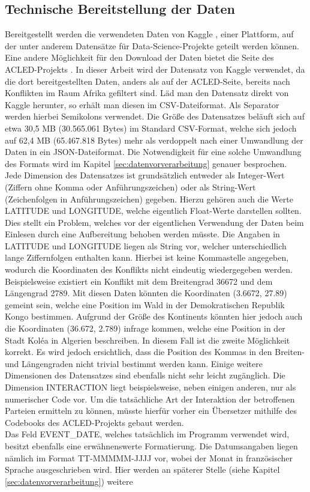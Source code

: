 \documentclass[usegeometry=true]{scrartcl}
\begin{document}
\subsection{Technische Bereitstellung der Daten}

Bereitgestellt werden die verwendeten Daten von Kaggle \cite{kaggle}, einer Plattform, auf der unter anderem Datensätze für Data-Science-Projekte geteilt werden können. Eine andere Möglichkeit für den Download der Daten bietet die Seite des ACLED-Projekts \cite{acled}. In dieser Arbeit wird der Datensatz von Kaggle verwendet, da die dort bereitgestellten Daten, anders als auf der ACLED-Seite, bereits nach Konflikten im Raum Afrika gefiltert sind. Läd man den Datensatz direkt von Kaggle herunter, so erhält man diesen im CSV-Dateiformat. Als Separator werden hierbei Semikolons verwendet. Die Größe des Datensatzes beläuft sich auf etwa 30,5 MB (30.565.061 Bytes) im Standard CSV-Format, welche sich jedoch auf 62,4 MB (65.467.818 Bytes) mehr als verdoppelt nach einer Umwandlung der Daten in ein JSON-Dateiformat. Die Notwendigkeit für eine solche Umwandlung des Formats wird im Kapitel \ref{sec:datenvorverarbeitung} genauer besprochen.\\ Jede Dimension des Datensatzes ist grundsätzlich entweder als Integer-Wert (Ziffern ohne Komma oder Anführungszeichen) oder als String-Wert (Zeichenfolgen in Anführungszeichen) gegeben. Hierzu gehören auch die Werte LATITUDE und LONGITUDE, welche eigentlich Float-Werte darstellen sollten. Dies stellt ein Problem, welches vor der eigentlichen Verwendung der Daten beim Einlesen durch eine Aufbereitung behoben werden müsste. Die Angaben in LATITUDE und LONGITUDE liegen als String vor, welcher unterschiedlich lange Ziffernfolgen enthalten kann. Hierbei ist keine Kommastelle angegeben, wodurch die Koordinaten des Konflikts nicht eindeutig wiedergegeben werden. Beispielsweise existiert ein Konflikt mit dem Breitengrad 36672 und dem Längengrad 2789. Mit diesen Daten könnten die Koordinaten (3.6672, 27.89) gemeint sein, welche eine Position im Wald in der Demokratischen Republik Kongo bestimmen. Aufgrund der Größe des Kontinents könnten hier jedoch auch die Koordinaten (36.672, 2.789) infrage kommen, welche eine Position in der Stadt Koléa in Algerien beschreiben. In diesem Fall ist die zweite Möglichkeit korrekt. Es wird jedoch ersichtlich, dass die Position des Kommas in den Breiten- und Längengraden nicht trivial bestimmt werden kann. Einige weitere Dimensionen des Datensatzes sind ebenfalls nicht sehr leicht zugänglich. Die Dimension INTERACTION liegt beispielsweise, neben einigen anderen, nur als numerischer Code vor. Um die tatsächliche Art der Interaktion der betroffenen Parteien ermitteln zu können, müsste hierfür vorher ein Übersetzer mithilfe des Codebooks des ACLED-Projekts \cite{acled-codebook} gebaut werden.\\ Das Feld EVENT\_DATE, welches tatsächlich im Programm verwendet wird, besitzt ebenfalls eine erwähnenswerte Formatierung. Die Datumsangaben liegen nämlich im Format \glqq TT-MMMMM-JJJJ\grqq{} vor, wobei der Monat in französischer Sprache ausgeschrieben wird. Hier werden an späterer Stelle (siehe Kapitel \ref{sec:datenvorverarbeitung}) weitere 
\end{document}
